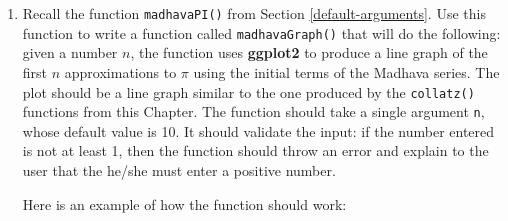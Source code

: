 \documentclass[]{book}
\theoremstyle{definition}
\theoremstyle{definition}
\theoremstyle{definition}
\theoremstyle{remark}
\begin{document}
{\begin{enumerate}
  \begin{quote}
  \end{quote}

  \begin{quote}
  98 bottles of beer on the wall,
  \end{quote}

  \begin{quote}
  98 bottles of beer!
  \end{quote}

  \begin{quote}
  Take one down and pass it around:
  \end{quote}

  \begin{quote}
  \ldots{}
  \end{quote}

  \begin{quote}
  1 bottle of beer on the wall.
  \end{quote}

  \begin{quote}
  1 bottle of beer!
  \end{quote}

  \begin{quote}
  Take it down and pass it around:
  \end{quote}

  \begin{quote}
  No more bottles of beer on the wall.
  \end{quote}

  Make sure to get the lyrics exactly right. For example, it's ``1
  bottle'', not ``1 bottles''.
\item
  Recall the function \texttt{madhavaPI()} from Section
  \ref{default-arguments}. Use this function to write a function called
  \texttt{madhavaGraph()} that will do the following: given a number
  \(n\), the function uses \textbf{ggplot2} to produce a line graph of
  the first \(n\) approximations to \(\pi\) using the initial terms of
  the Madhava series. The plot should be a line graph similar to the one
  produced by the \texttt{collatz()} functions from this Chapter. The
  function should take a single argument \texttt{n}, whose default value
  is 10. It should validate the input: if the number entered is not at
  least 1, then the function should throw an error and explain to the
  user that the he/she must enter a positive number.

  Here is an example of how the function should work:


\end{enumerate}}
\end{document}
